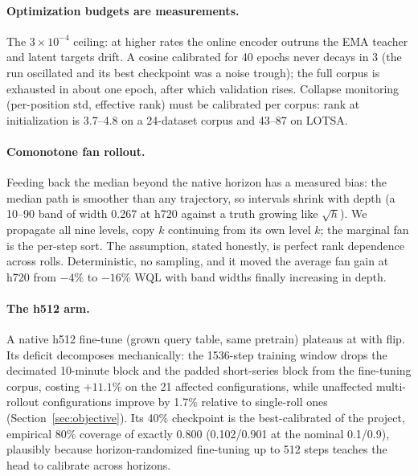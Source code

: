 \paragraph{Optimization budgets are measurements.}
The $3\times10^{-4}$ ceiling: at higher rates the online encoder outruns
the EMA teacher and latent targets drift. A cosine calibrated for 40
epochs never decays in 3 (the run oscillated and its best checkpoint was
a noise trough); the full corpus is exhausted in about one epoch, after
which validation rises. Collapse monitoring (per-position std, effective
rank) must be calibrated per corpus: rank at initialization is 3.7--4.8
on a 24-dataset corpus and 43--87 on LOTSA.

\paragraph{Comonotone fan rollout.}
Feeding back the median beyond the native horizon has a measured bias:
the median path is smoother than any trajectory, so intervals shrink with
depth (a 10--90 band of width 0.267 at h720 against a truth growing like
$\sqrt{h}$). We propagate all nine levels, copy $k$ continuing from its
own level $k$; the marginal fan is the per-step sort. The assumption,
stated honestly, is perfect rank dependence across rolls. Deterministic,
no sampling, and it moved the average fan gain at h720 from $-4\%$ to
$-16\%$ WQL with band widths finally increasing in depth.

\paragraph{The h512 arm.}
A native h512 fine-tune (grown query table, same pretrain) plateaus at
 with flip. Its deficit decomposes mechanically: the
1536-step training window drops the decimated 10-minute block and the
padded short-series block from the fine-tuning corpus, costing $+11.1\%$
on the 21 affected configurations, while unaffected multi-rollout
configurations improve by 1.7\% relative to single-roll ones
(Section~\ref{sec:objective}). Its 40\% checkpoint is the best-calibrated
of the project, empirical 80\% coverage of exactly 0.800 (0.102/0.901 at
the nominal 0.1/0.9), plausibly because horizon-randomized fine-tuning up
to 512 steps teaches the head to calibrate across horizons.


